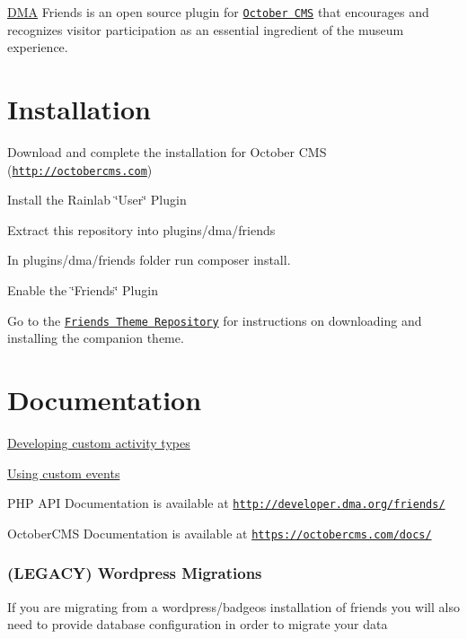 \hyperlink{namespaceDMA}{D\+M\+A} Friends is an open source plugin for \href{http://octobercms.com}{\tt October C\+M\+S} that encourages and recognizes visitor participation as an essential ingredient of the museum experience.

\section*{Installation}


\begin{DoxyItemize}
\item Download and complete the installation for October C\+M\+S (\href{http://octobercms.com}{\tt http\+://octobercms.\+com})
\item Install the Rainlab \char`\"{}\+User\char`\"{} Plugin
\item Extract this repository into plugins/dma/friends
\item In plugins/dma/friends folder run {\ttfamily composer install}.
\item Enable the \char`\"{}\+Friends\char`\"{} Plugin
\item Go to the \href{https://github.com/DallasMuseumArt/OctoberFriendsTheme}{\tt Friends Theme Repository} for instructions on downloading and installing the companion theme.
\end{DoxyItemize}

\section*{Documentation}

\hyperlink{md_docs_ACTIVITY-TYPES}{Developing custom activity types}

\hyperlink{md_docs_EVENTS}{Using custom events}

P\+H\+P A\+P\+I Documentation is available at \href{http://developer.dma.org/friends/}{\tt http\+://developer.\+dma.\+org/friends/}

October\+C\+M\+S Documentation is available at \href{https://octobercms.com/docs/}{\tt https\+://octobercms.\+com/docs/}

\subsubsection*{(L\+E\+G\+A\+C\+Y) Wordpress Migrations}

If you are migrating from a wordpress/badgeos installation of friends you will also need to provide database configuration in order to migrate your data


